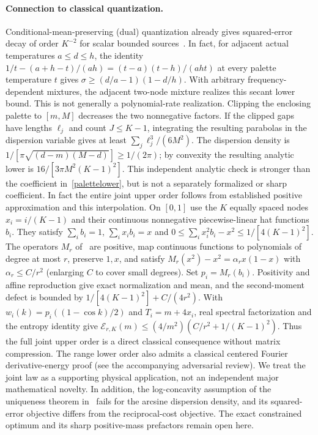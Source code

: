 \documentclass[11pt]{article}
\begin{document}
\paragraph{Connection to classical quantization.} Conditional-mean-preserving (dual) quantization already gives squared-error decay of order $K^{-2}$ for scalar bounded sources~\cite{dualquant,dualrate}. In fact, for adjacent actual temperatures $a\le d\le h$, the identity $1/t-(a+h-t)/(ah)=(t-a)(t-h)/(aht)$ at every palette temperature $t$ gives $\sigma\ge(d/a-1)(1-d/h)$. With arbitrary frequency-dependent mixtures, the adjacent two-node mixture realizes this secant lower bound. This is not generally a polynomial-rate realization. Clipping the enclosing palette to $[m,M]$ decreases the two nonnegative factors. If the clipped gaps have lengths $\ell_j$ and count $J\le K-1$, integrating the resulting parabolas in the dispersion variable gives at least $\sum_j\ell_j^3/(6M^2)$. The dispersion density is $1/[\pi\sqrt{(d-m)(M-d)}]\ge1/(2\pi)$; by convexity the resulting analytic lower is $16/[3\pi M^2(K-1)^2]$. This independent analytic check is stronger than the coefficient in~\eqref{palettelower}, but is not a separately formalized or sharp coefficient. In fact the entire joint upper order follows from established positive approximation and this interpolation. On $[0,1]$ use the $K$ equally spaced nodes $x_i=i/(K-1)$ and their continuous nonnegative piecewise-linear hat functions $b_i$. They satisfy $\sum_i b_i=1$, $\sum_i x_i b_i=x$ and $0\le\sum_i x_i^2b_i-x^2\le1/[4(K-1)^2]$. The operators $M_r$ of~\cite[Sec.~2.5]{kopotun} are positive, map continuous functions to polynomials of degree at most $r$, preserve $1,x$, and satisfy $M_r(x^2)-x^2=\alpha_r x(1-x)$ with $\alpha_r\le C/r^2$ (enlarging $C$ to cover small degrees). Set $p_i=M_r(b_i)$. Positivity and affine reproduction give exact normalization and mean, and the second-moment defect is bounded by $1/[4(K-1)^2]+C/(4r^2)$. With $w_i(k)=p_i((1-\cos k)/2)$ and $T_i=m+4x_i$, real spectral factorization and the entropy identity give $\mathcal E_{r,K}(m)\le (4/m^2)(C/r^2+1/(K-1)^2)$. Thus the full joint upper order is a direct classical consequence without matrix compression. The range lower order also admits a classical centered Fourier derivative-energy proof (see the accompanying adversarial review). We treat the joint law as a supporting physical application, not an independent major mathematical novelty. In addition, the log-concavity assumption of the uniqueness theorem in~\cite{jourdainpages} fails for the arcsine dispersion density, and its squared-error objective differs from the reciprocal-cost objective. The exact constrained optimum and its sharp positive-mass prefactors remain open here.
\end{document}
